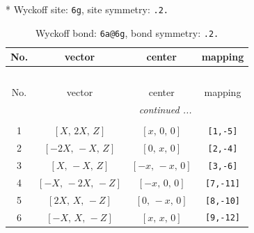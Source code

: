 \documentclass[fleqn,8pt]{jsarticle}
\begin{document}
* Wyckoff site: {\tt 6g}, site symmetry: {\tt .2.}
\renewcommand{\arraystretch}{1.2}
\begin{longtable}{cccc}
\caption{Wyckoff bond: {\tt 6a@6g}, bond symmetry: {\tt .2.}}
 \\
 \hline \hline
No. & vector & center & mapping \\ \hline \endfirsthead

\multicolumn{3}{l}{\tablename\ \thetable{}} \\
 \hline \hline
No. & vector & center & mapping \\ \hline \endhead

 \hline \hline
\multicolumn{3}{r}{\footnotesize\it continued ...} \\ \endfoot

 \hline \hline
\multicolumn{3}{r}{} \\ \endlastfoot

1 & $\left[ X,\, 2 X,\, Z \right]$ & $\left[ x,\, 0,\, 0 \right]$ & {\tt [1,-5]} \\ \hline
2 & $\left[ - 2 X,\, - X,\, Z \right]$ & $\left[ 0,\, x,\, 0 \right]$ & {\tt [2,-4]} \\ \hline
3 & $\left[ X,\, - X,\, Z \right]$ & $\left[ - x,\, - x,\, 0 \right]$ & {\tt [3,-6]} \\ \hline
4 & $\left[ - X,\, - 2 X,\, - Z \right]$ & $\left[ - x,\, 0,\, 0 \right]$ & {\tt [7,-11]} \\ \hline
5 & $\left[ 2 X,\, X,\, - Z \right]$ & $\left[ 0,\, - x,\, 0 \right]$ & {\tt [8,-10]} \\ \hline
6 & $\left[ - X,\, X,\, - Z \right]$ & $\left[ x,\, x,\, 0 \right]$ & {\tt [9,-12]} \\
\end{longtable}
\renewcommand{\arraystretch}{1.2}
\end{document}

